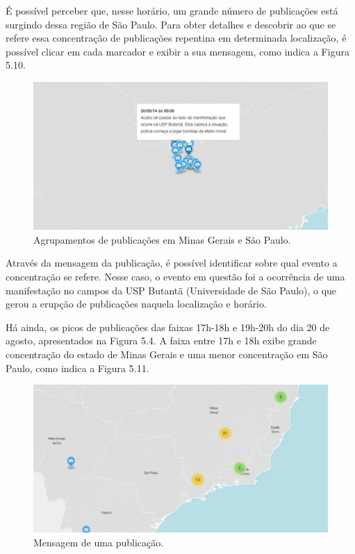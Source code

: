 É possível perceber que, nesse horário, um grande número de publicações está surgindo dessa região de São Paulo. Para obter detalhes e descobrir ao que se refere essa concentração de publicações repentina em determinada localização, é possível clicar em cada marcador e exibir a sua mensagem, como indica a Figura 5.10.

\begin{figure}[h!]
  \begin{center}
  \includegraphics[width=1.0\textwidth]{figuras/mapa-marcador-4.pdf}
  \caption{Agrupamentos de publicações em Minas Gerais e São Paulo.}
  \end{center}
\end{figure}

Através da mensagem da publicação, é possível identificar sobre qual evento a concentração se refere. Nesse caso, o evento em questão foi a ocorrência de uma manifestação no campos da USP Butantã (Universidade de São Paulo), o que gerou a erupção de publicações naquela localização e horário.

Há ainda, os picos de publicações das faixas 17h-18h e 19h-20h do dia 20 de agosto, apresentados na Figura 5.4. A faixa entre 17h e 18h exibe grande concentração do estado de Minas Gerais e uma menor concentração em São Paulo, como indica a Figura 5.11. 

\begin{figure}[h!]
  \begin{center}
  \includegraphics[width=1.0\textwidth]{figuras/mapa-marcador-6.pdf}
  \caption{Mensagem de uma publicação.}
  \end{center}
\end{figure}

